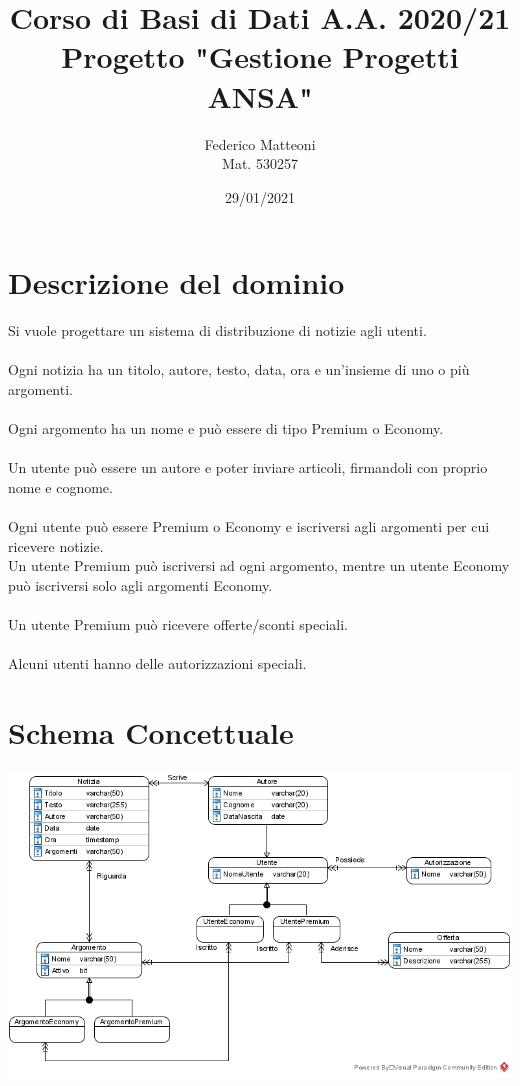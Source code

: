 \documentclass[10pt]{article}
\begin{document}
\renewcommand*\contentsname{Indice}
\title{Corso di Basi di Dati A.A. 2020/21\\Progetto "Gestione Progetti ANSA"}
\author{Federico Matteoni\\Mat. 530257}
\date{29/01/2021}
\maketitle
\pagebreak
\section{Descrizione del dominio}
Si vuole progettare un sistema di distribuzione di notizie agli utenti.\\\\
Ogni notizia ha un titolo, autore, testo, data, ora e un'insieme di uno o più argomenti.\\\\
Ogni argomento ha un nome e può essere di tipo Premium o Economy.\\\\
Un utente può essere un autore e poter inviare articoli, firmandoli con proprio nome e cognome.\\\\
Ogni utente può essere Premium o Economy e iscriversi agli argomenti per cui ricevere notizie.\\Un utente Premium può iscriversi ad ogni argomento, mentre un utente Economy può iscriversi solo agli argomenti Economy.\\\\
Un utente Premium può ricevere offerte/sconti speciali.\\\\
Alcuni utenti hanno delle autorizzazioni speciali.
\section{Schema Concettuale}
\begin{center}
	\includegraphics[scale=0.75]{Concettuale.jpg}
\end{center}
\end{document}
